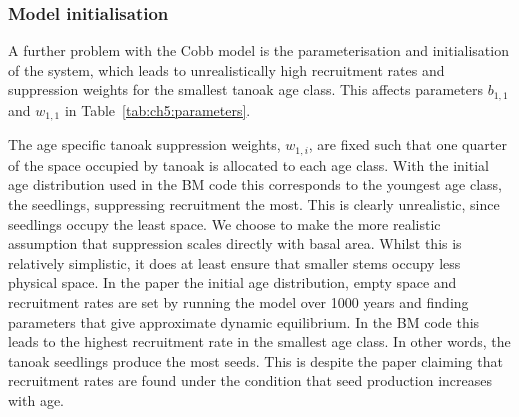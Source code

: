 \subsubsection{Model initialisation}

A further problem with the Cobb model is the parameterisation and initialisation of the system, which leads to unrealistically high recruitment rates and suppression weights for the smallest tanoak age class. This affects parameters $b_{1,1}$ and $w_{1,1}$ in Table~\ref{tab:ch5:parameters}.

The age specific tanoak suppression weights, $w_{1,i}$, are fixed such that one quarter of the space occupied by tanoak is allocated to each age class. With the initial age distribution used in the BM code this corresponds to the youngest age class, the seedlings, suppressing recruitment the most. This is clearly unrealistic, since seedlings occupy the least space. We choose to make the more realistic assumption that suppression scales directly with basal area. Whilst this is relatively simplistic, it does at least ensure that smaller stems occupy less physical space. In the paper the initial age distribution, empty space and recruitment rates are set by running the model over 1000 years and finding parameters that give approximate dynamic equilibrium. In the BM code this leads to the highest recruitment rate in the smallest age class. In other words, the tanoak seedlings produce the most seeds. This is despite the paper claiming that recruitment rates are found under the condition that seed production increases with age.

